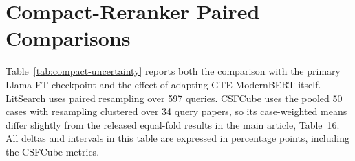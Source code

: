 \documentclass[pdflatex,sn-basic,Numbered]{sn-jnl}%
\theoremstyle{thmstyleone}%
\theoremstyle{thmstyletwo}%
\theoremstyle{thmstylethree}%
\begin{document}
\FloatBarrier
\section{Compact-Reranker Paired Comparisons}
\label{app:compact-uncertainty}

Table~\ref{tab:compact-uncertainty} reports both the comparison with the
primary Llama FT checkpoint and the effect of adapting GTE-ModernBERT itself.
LitSearch uses paired resampling over 597 queries. CSFCube uses the pooled
50 cases with resampling clustered over 34 query papers, so its case-weighted
means differ slightly from the released equal-fold results in
the main article, Table~16. All deltas and intervals in this table are
expressed in percentage points, including the CSFCube metrics.

\begin{table}[htbp]



\end{table}
\end{document}
